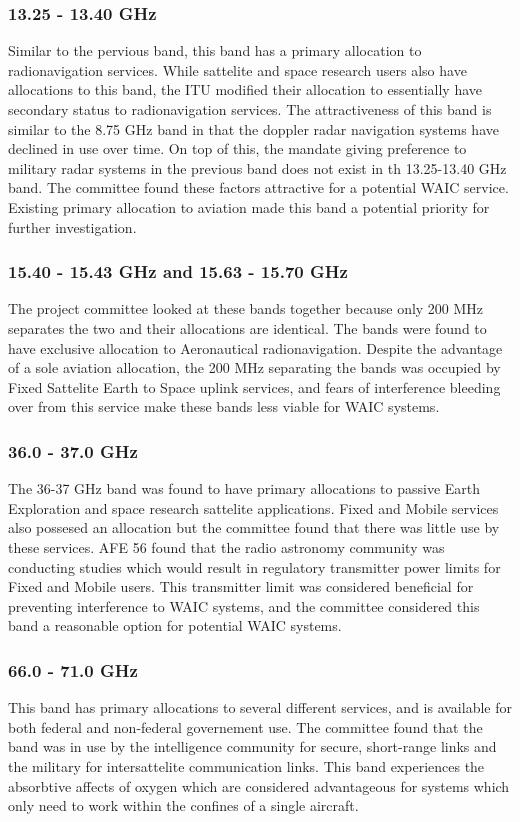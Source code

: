 \subsubsection{13.25 - 13.40 GHz}
Similar to the pervious band, this band has a primary allocation to radionavigation services. While sattelite and space research users also have allocations to this band, the ITU modified their allocation to essentially have secondary status to radionavigation services. The attractiveness of this band is similar to the 8.75 GHz band in that the doppler radar navigation systems have declined in use over time. On top of this, the mandate giving preference to military radar systems in the previous band does not exist in th 13.25-13.40 GHz band. The committee found these factors attractive for a potential WAIC service. Existing primary allocation to aviation made this band a potential priority for further investigation.

\subsubsection{15.40 - 15.43 GHz and 15.63 - 15.70 GHz}
The project committee looked at these bands together because only 200 MHz separates the two and their allocations are identical. The bands were found to have exclusive allocation to Aeronautical radionavigation. Despite the advantage of a sole aviation allocation, the 200 MHz separating the bands was occupied by Fixed Sattelite Earth to Space uplink services, and fears of interference bleeding over from this service make these bands less viable for WAIC systems. 

\subsubsection{36.0 - 37.0 GHz}
The 36-37 GHz band was found to have primary allocations to passive Earth Exploration and space research sattelite applications. Fixed and Mobile services also possesed an allocation but the committee found that there was little use by these services. AFE 56 found that the radio astronomy community was conducting studies which would result in regulatory transmitter power limits for Fixed and Mobile users. This transmitter limit was considered beneficial for preventing interference to WAIC systems, and the committee considered this band a reasonable option for potential WAIC systems. 


\subsubsection{66.0 - 71.0 GHz}
This band has primary allocations to several different services, and is available for both federal and non-federal governement use. The committee found that the band was in use by the intelligence community for secure, short-range links and the military for intersattelite communication links. This band experiences the absorbtive affects of oxygen which are considered advantageous for systems which only need to work within the confines of a single aircraft.

